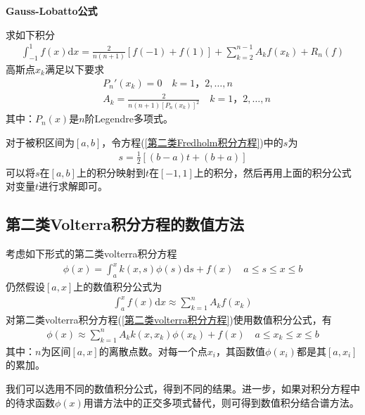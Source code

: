			\textbf{Gauss-Lobatto公式}
			\par
			求如下积分
			\begin{align*}
				\int_{-1}^{1} f(x) \mathrm{d}x = \frac{2}{n(n+1)} [f(-1) + f(1)] + \sum_{k = 2}^{n-1} A_k f(x_k)+R_n(f)
			\end{align*}
			高斯点$x_k$满足以下要求
			\begin{align*}
				&P_n'(x_k) = 0 \quad k = 1，2,\dots,n\\
				&A_k = \frac{2}{n(n+1)[P_n(x_k)]^2} \quad k = 1，2,\dots,n
			\end{align*}
			其中：$P_n(x)$是$n$阶Legendre多项式。
			\par
			对于被积区间为$[a,b]$，令方程(\ref{第二类Fredholm积分方程})中的$s$为
			\begin{align*}
				s = \frac{1}{2} [(b-a)t +(b+a)]
			\end{align*}
			可以将$s$在$[a,b]$上的积分映射到$t$在$[-1,1]$上的积分，然后再用上面的积分公式对变量$t$进行求解即可。

	\subsection{第二类Volterra积分方程的数值方法}
		\label{subsec:第二类volterra积分方程的数值方法}
		\par
		考虑如下形式的第二类volterra积分方程
		\begin{align}
			\label{第二类volterra积分方程}
			\phi(x) = \int_{a}^{x} k(x,s) \phi(s)\mathrm{d}s + f(x) \quad a \leqslant s \leqslant x \leqslant b
		\end{align}
		仍然假设$[a,x]$上的数值积分公式为
		\begin{align*}
			 \int_a^x f(x) \mathrm{d}x \approx \sum_{k = 1}^n A_k f(x_k)
		\end{align*}
		对第二类volterra积分方程(\ref{第二类volterra积分方程})使用数值积分公式，有
		\begin{align*}
			\phi(x) \approx \sum_{k = 1}^n A_k k(x,x_k) \phi(x_k) + f(x) \quad a \leqslant x_k \leqslant x \leqslant b
		\end{align*}
		其中：$n$为区间$[a,x]$的离散点数。对每一个点$x_i$，其函数值$\phi(x_i)$都是其$[a,x_i]$的累加。
		\par
		我们可以选用不同的数值积分公式，得到不同的结果。进一步，如果对积分方程中的待求函数$\phi(x)$用谱方法中的正交多项式替代，则可得到数值积分结合谱方法。

